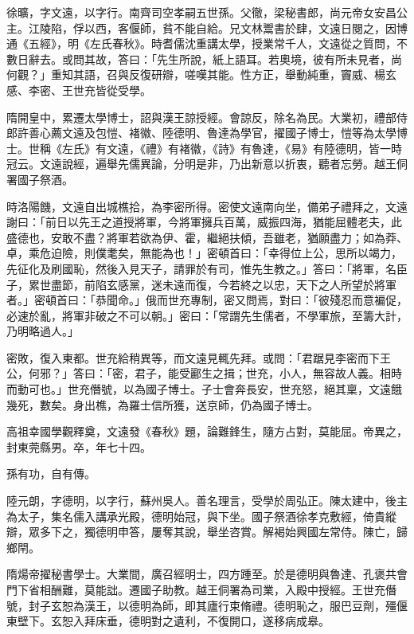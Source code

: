 \begin{pinyinscope}
 徐曠，字文遠，以字行。南齊司空孝嗣五世孫。父徹，梁秘書郎，尚元帝女安昌公主。江陵陷，俘以西，客偃師，貧不能自給。兄文林鬻書於肆，文遠日閱之，因博通《五經》，明《左氏春秋》。時耆儒沈重講太學，授業常千人，文遠從之質問，不數日辭去。或問其故，答曰：「先生所說，紙上語耳。若奧境，彼有所未見者，尚何觀？」重知其語，召與反復研辯，嗟嘆其能。性方正，舉動純重，竇威、楊玄感、李密、王世充皆從受學。



 隋開皇中，累遷太學博士，詔與漢王諒授經。會諒反，除名為民。大業初，禮部侍郎許善心薦文遠及包愷、褚徽、陸德明、魯達為學官，擢國子博士，愷等為太學博士。世稱《左氏》有文遠，《禮》有褚徽，《詩》有魯達，《易》有陸德明，皆一時冠云。文遠說經，遍舉先儒異論，分明是非，乃出新意以折衷，聽者忘勞。越王侗署國子祭酒。



 時洛陽饑，文遠自出城樵拾，為李密所得。密使文遠南向坐，備弟子禮拜之，文遠謝曰：「前日以先王之道授將軍，今將軍擁兵百萬，威振四海，猶能屈體老夫，此盛德也，安敢不盡？將軍若欲為伊、霍，繼絕扶傾，吾雖老，猶願盡力；如為莽、卓，乘危迫險，則僕耄矣，無能為也！」密頓首曰：「幸得位上公，思所以竭力，先征化及刷國恥，然後入見天子，請罪於有司，惟先生教之。」答曰：「將軍，名臣子，累世盡節，前陷玄感黨，迷未遠而復，今若終之以忠，天下之人所望於將軍者。」密頓首曰：「恭聞命。」俄而世充專制，密又問焉，對曰：「彼殘忍而意褊促，必速於亂，將軍非破之不可以朝。」密曰：「常謂先生儒者，不學軍旅，至籌大計，乃明略過人。」



 密敗，復入東都。世充給稍異等，而文遠見輒先拜。或問：「君踞見李密而下王公，何邪？」答曰：「密，君子，能受酈生之揖；世充，小人，無容故人義。相時而動可也。」世充僭號，以為國子博士。子士會奔長安，世充怒，絕其稟，文遠餓幾死，數矣。身出樵，為羅士信所獲，送京師，仍為國子博士。



 高祖幸國學觀釋奠，文遠發《春秋》題，論難鋒生，隨方占對，莫能屈。帝異之，封東莞縣男。卒，年七十四。



 孫有功，自有傳。



 陸元朗，字德明，以字行，蘇州吳人。善名理言，受學於周弘正。陳太建中，後主為太子，集名儒入講承光殿，德明始冠，與下坐。國子祭酒徐孝克敷經，倚貴縱辯，眾多下之，獨德明申答，屢奪其說，舉坐咨賞。解褐始興國左常侍。陳亡，歸鄉閈。



 隋煬帝擢秘書學士。大業間，廣召經明士，四方踵至。於是德明與魯達、孔褒共會門下省相酬難，莫能詘。遷國子助教。越王侗署為司業，入殿中授經。王世充僭號，封子玄恕為漢王，以德明為師，即其廬行束脩禮。德明恥之，服巴豆劑，殭偃東壁下。玄恕入拜床垂，德明對之遺利，不復開口，遂移病成皋。




\end{pinyinscope}
